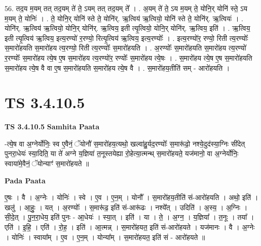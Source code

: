 \documentclass[17pt]{extarticle}
\begin{document}
56. तद॒य म॒यम् तत् तद॒यम् ते॑ ते॒ ऽयम् तत् तद॒यम् ते᳚ । . अ॒यम् ते॑ ते॒ ऽय म॒यम् ते॒ योनि॒र् योनि॑ स्ते॒ ऽय म॒यम् ते॒ योनिः॑ । . ते॒ योनि॒र् योनि॑ स्ते ते॒ योनि॑र्. ऋ॒त्विय॑ ऋ॒त्वियो॒ योनि॑ स्ते ते॒ योनि॑र्. ऋ॒त्वियः॑ । . योनि॑र्. ऋ॒त्विय॑ ऋ॒त्वियो॒ योनि॒र् योनि॑र्. ऋ॒त्विय॒ इती त्यृ॒त्वियो॒ योनि॒र् योनि॑र्. ऋ॒त्विय॒ इति॑ । . ऋ॒त्विय॒ इती त्यृ॒त्विय॑ ऋ॒त्विय॒ इत्य॒रण्यो॑ र॒रण्यो॒ रित्यृ॒त्विय॑ ऋ॒त्विय॒ इत्य॒रण्योः᳚ । . इत्य॒रण्यो॑र॒ रण्यो॒ रिती त्य॒रण्योः᳚ स॒मारो॑हयति स॒मारो॑हय त्य॒रण्यो॒ रिती त्य॒रण्योः᳚ स॒मारो॑हयति । . अ॒रण्योः᳚ स॒मारो॑हयति स॒मारो॑हय त्य॒रण्यो॑ र॒रण्योः᳚ स॒मारो॑हय त्ये॒ष ए॒ष स॒मारो॑हय
त्य॒रण्यो॑र॒ रण्योः᳚ स॒मारो॑हय त्ये॒षः । . स॒मारो॑हय त्ये॒ष ए॒ष स॒मारो॑हयति स॒मारो॑हय त्ये॒ष वै वा ए॒ष स॒मारो॑हयति स॒मारो॑हय
त्ये॒ष वै । . स॒मारो॑हय॒तीति॑ सम् - आरो॑हयति । \newline
\pagebreak
{}

\section{ TS 3.4.10.5 }

\textbf{TS 3.4.10.5 } \newline
\textbf{Samhita Paata} \newline

-त्ये॒ष वा अ॒ग्नेर्योनिः॒ स्व ए॒वैनं॒ ॅयोनौ॑ स॒मारो॑हय॒त्यथो॒ खल्वा॑हु॒र्यद॒रण्योः᳚ स॒मारू॑ढो॒ नश्ये॒दुद॑स्या॒ग्निः सी॑देत् पुनरा॒धेयः॑ स्या॒दिति॒ या ते॑ अग्ने य॒ज्ञिया॑ त॒नूस्तयेह्या रो॒हेत्या॒त्मन्थ् स॒मारो॑हयते॒ यज॑मानो॒ वा अ॒ग्नेर्योनिः॒ स्वाया॑मे॒वैनं॒ ॅयोन्याꣳ॑ स॒मारो॑हयते ॥ \newline

\textbf{Pada Paata} \newline

ए॒षः । वै । अ॒ग्नेः । योनिः॑ । स्वे । ए॒व । ए॒न॒म् । योनौ᳚ । स॒मारो॑हय॒तीति॑ सं-आरो॑हयति । अथो॒ इति॑ । खलु॑ । आ॒हुः॒ । यत् । अ॒रण्योः᳚ । स॒मारू॑ढ॒ इति॑ सं-आरू॑ढः । नश्ये᳚त् । उदिति॑ । अ॒स्य॒ । अ॒ग्निः । सी॒दे॒त् । पु॒न॒रा॒धेय॒ इति॑ पुनः - आ॒धेयः॑ । स्या॒त् । इति॑ । या । ते॒ । अ॒ग्न॒ । य॒ज्ञिया᳚ । त॒नूः । तया᳚ । एति॑ । इ॒हि॒ । एति॑ । रो॒ह॒ । इति॑ । आ॒त्मन्न् । स॒मारो॑हयत॒ इति॑ सं-आरो॑हयते । यज॑मानः । वै । अ॒ग्नेः । योनिः॑ । स्वाया᳚म् । ए॒व । ए॒न॒म् । योन्या᳚म् । स॒मारो॑हयत॒ इति॑ सं - आरो॑हयते ॥  \newline
\end{document}
